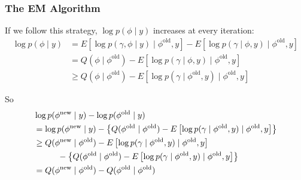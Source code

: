 \documentclass{beamer}
\begin{document}
\begin{frame}[fragile]
\frametitle{The EM Algorithm}

If we follow this strategy, $\log p(\phi \mid y)$ increases at every iteration:
\begin{align*}
\log p(\phi \mid y) &=  E\left[ \log p(\gamma, \phi \mid y) \mid \phi^{\text{old}}, y \right] - E\left[\log p(\gamma \mid \phi, y) \mid \phi^{\text{old}}, y \right]\\
&= Q(\phi \mid \phi^{\text{old}}) - E\left[\log p(\gamma \mid \phi, y) \mid \phi^{\text{old}}, y \right] \tag{defn. Q} \\
&\ge Q(\phi \mid \phi^{\text{old}}) - E\left[\log p(\gamma \mid \phi^{\text{old}}, y) \mid \phi^{\text{old}}, y \right] \tag{HW}
\end{align*}
\pause

So 
\begin{align*}
&\log p(\phi^{\text{new}} \mid y) - \log p(\phi^{\text{old}} \mid y) \\
&= \log p(\phi^{\text{new}} \mid y) - \left\{Q(\phi^{\text{old}} \mid \phi^{\text{old}}) - E\left[\log p(\gamma \mid \phi^{\text{old}}, y) \mid \phi^{\text{old}}, y \right] \right\} \\
&\ge Q(\phi^{\text{new}} \mid \phi^{\text{old}}) - E\left[\log p(\gamma \mid \phi^{\text{old}}, y) \mid \phi^{\text{old}}, y \right] \\
&\hspace{10mm} - \left\{Q(\phi^{\text{old}} \mid \phi^{\text{old}}) - E\left[\log p(\gamma \mid \phi^{\text{old}}, y) \mid \phi^{\text{old}}, y \right] \right\} \\
&= Q(\phi^{\text{new}} \mid \phi^{\text{old}}) - Q(\phi^{\text{old}} \mid \phi^{\text{old}})
\end{align*}

\end{frame}
\end{document}
